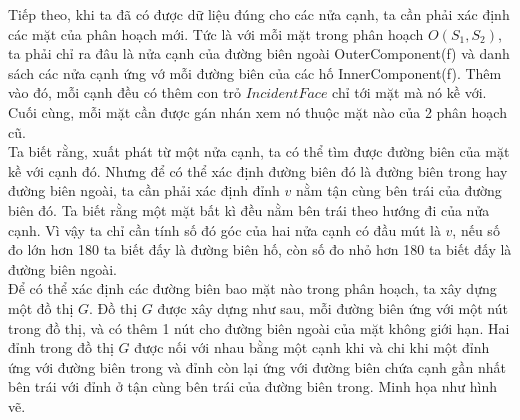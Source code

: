 \documentclass[15pt]{article}
\begin{document}
{Tiếp theo, khi ta đã có được dữ liệu đúng cho các nửa cạnh, ta cần phải xác định các mặt của phân hoạch mới. Tức là với mỗi mặt trong phân hoạch $O(S_1,S_2)$, ta phải chỉ ra đâu là nửa cạnh của đường biên ngoài OuterComponent(f) và danh sách các nửa cạnh ứng vớ mỗi đường biên của các hố InnerComponent(f). Thêm vào đó, mỗi cạnh đều có thêm con trỏ $IncidentFace$ chỉ tới mặt mà nó kề với. Cuối cùng, mỗi mặt cần được gán nhán xem nó thuộc mặt nào của 2 phân hoạch cũ. \\

Ta biết rằng, xuất phát từ một nửa cạnh, ta có thể tìm được đường biên của mặt kề với cạnh đó. Nhưng để có thể xác định đường biên đó là đường biên trong hay đường biên ngoài, ta cần phải xác định đỉnh $v$ nằm tận cùng bên trái của đường biên đó. Ta biết rằng một mặt bất kì đều nằm bên trái theo hướng đi của nửa cạnh. Vì vậy ta chỉ cần tính số đó góc của hai nửa cạnh có đầu mút là $v$, nếu số đo lớn hơn 180 ta biết đấy là đường biên hố, còn số đo nhỏ hơn 180 ta biết đấy là đường biên ngoài. \\

Để có thể xác định các đường biên bao mặt nào trong phân hoạch, ta xây dựng một đồ thị $G$. Đồ thị $G$ được xây dựng như sau, mỗi đường biên ứng với một nút trong đồ thị, và có thêm 1 nút cho đường biên ngoài của mặt không giới hạn. Hai đỉnh trong đồ thị $G$ được nối với nhau bằng một cạnh khi và chi khi một đỉnh ứng với đường biên trong và đỉnh còn lại ứng với đường biên chứa cạnh gần nhất bên trái với đỉnh ở tận cùng bên trái của đường biên trong. Minh họa như hình vẽ. \\

}
\end{document}
